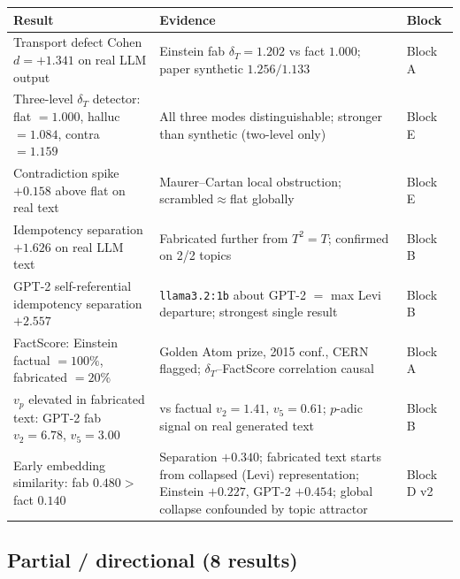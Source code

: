 \documentclass[11pt]{amsart}
\theoremstyle{definition}
\begin{document}
\begin{center}
\renewcommand{\arraystretch}{1.25}
\small
\begin{tabular}{@{}p{6.5cm}p{6cm}p{1.8cm}@{}}
\toprule
Result & Evidence & Block \\
\midrule
Transport defect Cohen $d=+1.341$ on real LLM output &
  Einstein fab $\delta_T=1.202$ vs fact $1.000$; paper synthetic $1.256/1.133$ &
  Block A \\
Three-level $\delta_T$ detector: flat $=1.000$, halluc $=1.084$, contra $=1.159$ &
  All three modes distinguishable; stronger than synthetic (two-level only) &
  Block E \\
Contradiction spike $+0.158$ above flat on real text &
  Maurer--Cartan local obstruction; scrambled$\approx$flat globally &
  Block E \\
Idempotency separation $+1.626$ on real LLM text &
  Fabricated further from $T^2=T$; confirmed on 2/2 topics &
  Block B \\
GPT-2 self-referential idempotency separation $+2.557$ &
  \texttt{llama3.2:1b} about GPT-2 $=$ max Levi departure; strongest single result &
  Block B \\
FactScore: Einstein factual $=100\%$, fabricated $=20\%$ &
  Golden Atom prize, 2015 conf., CERN flagged; $\delta_T$--FactScore correlation causal &
  Block A \\
$v_p$ elevated in fabricated text: GPT-2 fab $v_2=6.78$, $v_5=3.00$ &
  vs factual $v_2=1.41$, $v_5=0.61$; $p$-adic signal on real generated text &
  Block B \\
Early embedding similarity: fab $0.480>$ fact $0.140$ &
  Separation $+0.340$; fabricated text starts from collapsed (Levi) representation;
  Einstein $+0.227$, GPT-2 $+0.454$; global collapse confounded by topic attractor &
  Block D v2 \\
\bottomrule
\end{tabular}
\end{center}

\subsection{Partial / directional (8 results)}
\end{document}
